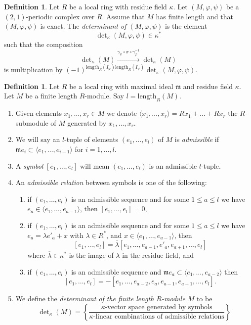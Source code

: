 \documentclass{amsart}
\theoremstyle{plain}
\theoremstyle{definition}
\newtheorem{definition}[subsection]{Definition}
\theoremstyle{remark}
\numberwithin{equation}{subsection}
\begin{document}
\begin{definition}
\label{definition-periodic-determinant}
Let $R$ be a local ring with residue field $\kappa$.
Let $(M, \varphi, \psi)$ be a $(2, 1)$-periodic complex over $R$.
Assume that $M$ has finite length and that $(M, \varphi, \psi)$ is
exact. The {\it determinant of $(M, \varphi, \psi)$} is
the element
$$
\det\nolimits_\kappa(M, \varphi, \psi) \in \kappa^*
$$
such that the composition
$$
\det\nolimits_\kappa(M)
\xrightarrow{\gamma_\psi \circ \sigma \circ \gamma_\varphi^{-1}}
\det\nolimits_\kappa(M)
$$
is multiplication by
$(-1)^{\text{length}_R(I_\varphi)\text{length}_R(I_\psi)}
\det\nolimits_\kappa(M, \varphi, \psi)$.
\end{definition}

\begin{definition}
\label{definition-determinant}
Let $R$ be a local ring with maximal ideal $\mathfrak m$ and
residue field $\kappa$. Let $M$ be a finite length $R$-module.
Say $l = \text{length}_R(M)$.
\begin{enumerate}
\item Given elements $x_1, \ldots, x_r \in M$ we denote
$\langle x_1, \ldots, x_r \rangle = Rx_1 + \ldots + Rx_r$ the
$R$-submodule of $M$ generated by $x_1, \ldots, x_r$.
\item We will say an $l$-tuple of elements
$(e_1, \ldots, e_l)$ of $M$ is {\it admissible} if
$\mathfrak m e_i \subset \langle e_1, \ldots, e_{i - 1} \rangle$
for $i = 1, \ldots, l$.
\item A {\it symbol} $[e_1, \ldots, e_l]$ will mean
$(e_1, \ldots, e_l)$ is an admissible $l$-tuple.
\item An {\it admissible relation} between symbols is one of the following:
\begin{enumerate}
\item if $(e_1, \ldots, e_l)$ is an admissible sequence and
for some $1 \leq a \leq l$ we have
$e_a \in \langle e_1, \ldots, e_{a - 1}\rangle$, then
$[e_1, \ldots, e_l] = 0$,
\item if $(e_1, \ldots, e_l)$ is an admissible sequence and
for some $1 \leq a \leq l$ we have $e_a = \lambda e'_a + x$
with $\lambda \in R^*$, and
$x \in \langle e_1, \ldots, e_{a - 1}\rangle$, then
$$
[e_1, \ldots, e_l] =
\overline{\lambda} [e_1, \ldots, e_{a - 1}, e'_a, e_{a + 1}, \ldots, e_l]
$$
where $\overline{\lambda} \in \kappa^*$ is the image of $\lambda$ in
the residue field, and
\item if $(e_1, \ldots, e_l)$ is an admissible sequence and
$\mathfrak m e_a \subset \langle e_1, \ldots, e_{a - 2}\rangle$ then
$$
[e_1, \ldots, e_l] =
- [e_1, \ldots, e_{a - 2}, e_a, e_{a - 1}, e_{a + 1}, \ldots, e_l].
$$
\end{enumerate}
\item
We define the {\it determinant of the finite length $R$-module $M$} to be
$$
\det\nolimits_\kappa(M) =
\left\{
\frac{\kappa\text{-vector space generated by symbols}}
{\kappa\text{-linear combinations of admissible relations}}
\right\}
$$
\end{enumerate}
\end{definition}
\end{document}
